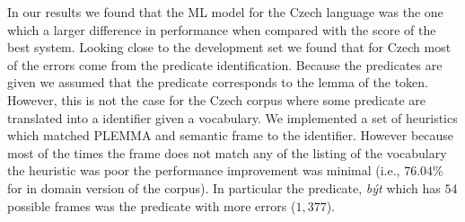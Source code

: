 
In our results we found that the ML model for the Czech language was the one 
which a larger difference in performance when compared with the score of the 
best system. Looking close to the development set we found that for Czech most 
of the errors come from the predicate identification. Because the predicates are 
given we assumed that the predicate corresponds to the lemma of the token.  
However, this is not the case for the Czech corpus where some predicate are 
translated into a identifier given a vocabulary. We implemented a set of 
heuristics which matched PLEMMA and semantic frame to the identifier.  However 
because most of the times the frame does not match any of the listing of the 
vocabulary the heuristic was poor the performance improvement was minimal (i.e., 
$76.04\%$ for in domain version of the corpus). In particular the predicate, 
\emph{být} which has $54$ possible frames was the predicate with more errors 
($1,377$). 




